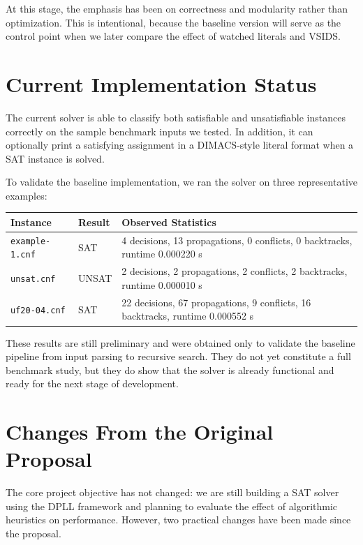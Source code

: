 \documentclass[11pt]{article}
\begin{document}
At this stage, the emphasis has been on correctness and modularity rather than optimization. This
is intentional, because the baseline version will serve as the control point when we later compare
the effect of watched literals and VSIDS.

\section{Current Implementation Status}

The current solver is able to classify both satisfiable and unsatisfiable instances correctly on the
sample benchmark inputs we tested. In addition, it can optionally print a satisfying assignment in a
DIMACS-style literal format when a SAT instance is solved.

To validate the baseline implementation, we ran the solver on three representative examples:

\begin{center}
\begin{tabular}{p{3.1cm} p{1.2cm} p{7.2cm}}
\toprule
\textbf{Instance} & \textbf{Result} & \textbf{Observed Statistics} \\
\midrule
\texttt{example-1.cnf} & SAT & 4 decisions, 13 propagations, 0 conflicts, 0 backtracks, runtime 0.000220 s \\
\texttt{unsat.cnf} & UNSAT & 2 decisions, 2 propagations, 2 conflicts, 2 backtracks, runtime 0.000010 s \\
\texttt{uf20-04.cnf} & SAT & 22 decisions, 67 propagations, 9 conflicts, 16 backtracks, runtime 0.000552 s \\
\bottomrule
\end{tabular}
\end{center}

These results are still preliminary and were obtained only to validate the baseline pipeline from
input parsing to recursive search. They do not yet constitute a full benchmark study, but they do
show that the solver is already functional and ready for the next stage of development.

\section{Changes From the Original Proposal}

The core project objective has not changed: we are still building a SAT solver using the DPLL
framework and planning to evaluate the effect of algorithmic heuristics on performance. However,
two practical changes have been made since the proposal.
\end{document}
